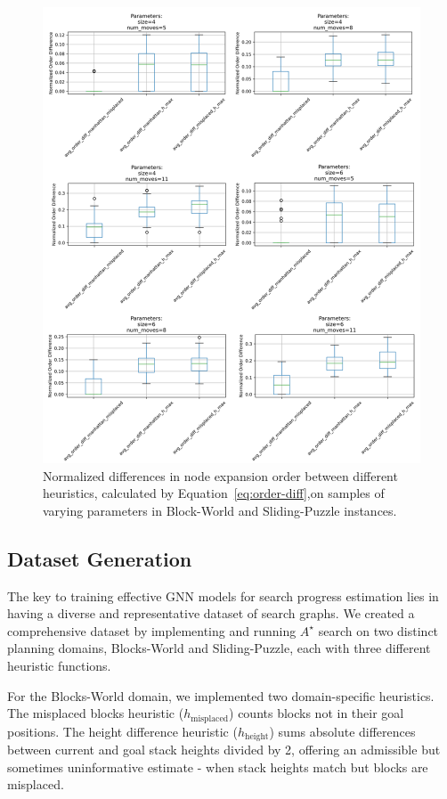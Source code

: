 \documentclass[letterpaper]{article}
\begin{document}
\begin{figure}[ht]
\begin{minipage}{0.39\textwidth}
        \includegraphics[width=\textwidth]{plots/sliding_puzzle_order_differences_2.png}
    \end{minipage}
    \caption{Normalized differences in node expansion order between different heuristics, calculated by Equation~\ref{eq:order-diff},on samples of varying parameters in Block-World and Sliding-Puzzle instances.}
    \label{fig:heuristic-order}
\end{figure}

\subsection{Dataset Generation}

The key to training effective GNN models for search progress estimation lies in having a diverse and representative dataset of search graphs. We created a comprehensive dataset by implementing and running $A^{\star}$ search on two distinct planning domains, Blocks-World and Sliding-Puzzle, each with three different heuristic functions.

For the Blocks-World domain, we implemented two domain-specific heuristics. The misplaced blocks heuristic ($h_{\text{misplaced}}$) counts blocks not in their goal positions. The height difference heuristic ($h_{\text{height}}$) sums absolute differences between current and goal stack heights divided by 2, offering an admissible but sometimes uninformative estimate - when stack heights match but blocks are misplaced.
\end{document}
